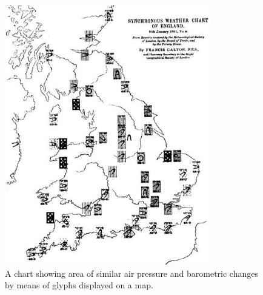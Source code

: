 \begin{figure}[h]
\centering
\includegraphics[width=0.8\textwidth,keepaspectratio]{images/history/weather.jpg}
\caption[
    A chart showing area of similar air pressure and barometric changes by means of glyphs displayed on a map., Urldate: 07.2016 \newline
\small\texttt{\url{http://datavis.ca/milestones//admin/uploads/images/galton-weather-charts2.gif}}
]{A chart showing area of similar air pressure and barometric changes by means of glyphs displayed on a map.}
\label{fig:weather-map}
\end{figure}

